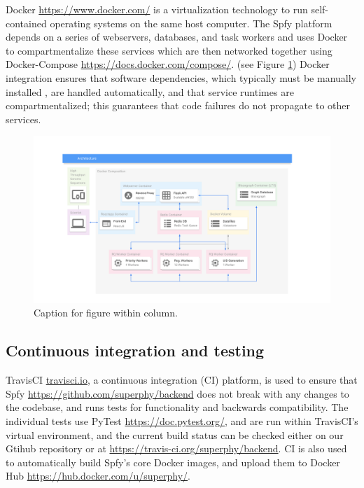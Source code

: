 \documentclass[a4,center,fleqn]{NAR}
\begin{document}

Docker \url{https://www.docker.com/} is a virtualization technology to run self-contained operating systems on the same host computer.
The Spfy platform depends on a series of webservers, databases, and task workers and uses Docker to compartmentalize these services which are then networked together using Docker-Compose \url{https://docs.docker.com/compose/}.
(see Figure \ref{fig-docker})
Docker integration ensures that software dependencies, which typically must be manually installed \cite{doi:10.1093/bioinformatics/btu153,laing2010pan,inouye2014srst2,naccache2014cloud}, are handled automatically, and that service runtimes are compartmentalized; this guarantees that code failures do not propagate to other services.

\begin{figure}[t]
\begin{center}
\includegraphics{images/docker.svg}
\end{center}
\caption{Caption for figure within column.}
\label{fig-docker}
\end{figure}

\subsection{Continuous integration and testing}

TravisCI \url{travisci.io}, a continuous integration (CI) platform, is used to ensure that Spfy \url{https://github.com/superphy/backend} does not break with any changes to the codebase, and runs tests for functionality and backwards compatibility.
The individual tests use PyTest \url{https://doc.pytest.org/}, and are run within TravisCI's virtual environment, and the current build status can be checked either on our Gtihub repository or at \url{https://travis-ci.org/superphy/backend}.
CI is also used to automatically build Spfy's core Docker images, and upload them to Docker Hub \url{https://hub.docker.com/u/superphy/}.
\end{document}

